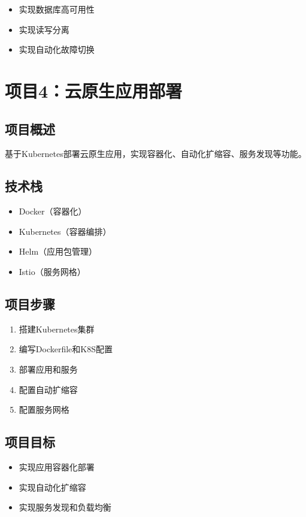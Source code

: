 \documentclass[12pt,UTF8]{ctexbook}
\begin{document}
\begin{itemize}
    \item 实现数据库高可用性
    \item 实现读写分离
    \item 实现自动化故障切换
\end{itemize}

\section{项目4：云原生应用部署}
\label{sec:project-cloud-native}

\subsection*{项目概述}

基于Kubernetes部署云原生应用，实现容器化、自动化扩缩容、服务发现等功能。

\subsection*{技术栈}

\begin{itemize}
    \item Docker（容器化）
    \item Kubernetes（容器编排）
    \item Helm（应用包管理）
    \item Istio（服务网格）
\end{itemize}

\subsection*{项目步骤}

\begin{enumerate}
    \item 搭建Kubernetes集群
    \item 编写Dockerfile和K8S配置
    \item 部署应用和服务
    \item 配置自动扩缩容
    \item 配置服务网格
\end{enumerate}

\subsection*{项目目标}

\begin{itemize}
    \item 实现应用容器化部署
    \item 实现自动化扩缩容
    \item 实现服务发现和负载均衡
\end{itemize}
\end{document}
